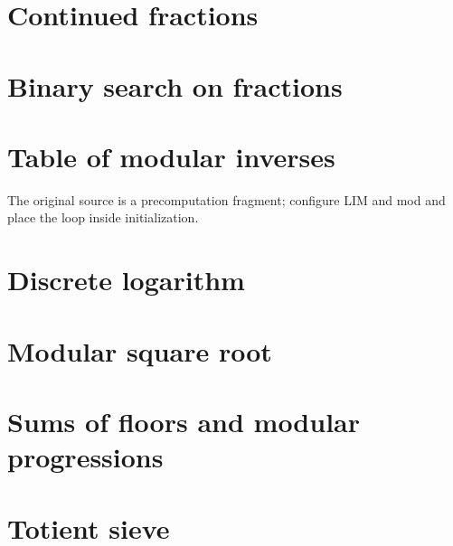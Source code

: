 \section{Continued fractions}

\section{Binary search on fractions}

\section{Table of modular inverses}
The original source is a precomputation fragment; configure LIM and mod and place the loop inside initialization.

\section{Discrete logarithm}

\section{Modular square root}

\section{Sums of floors and modular progressions}

\section{Totient sieve}

